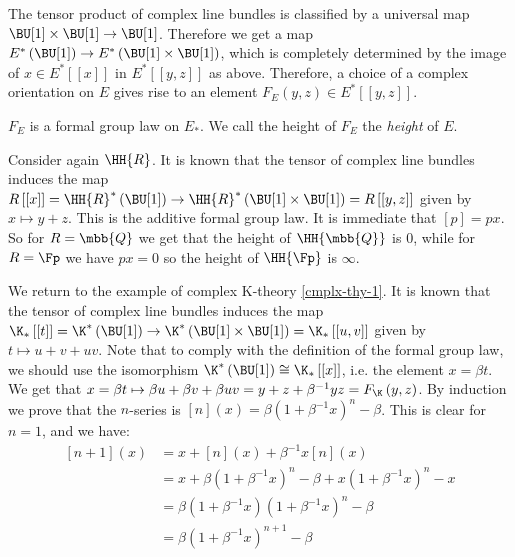 The tensor product of complex line bundles is classified by a universal map $\BU[1] \times \BU[1] \to \BU[1]$.
Therefore we get a map $E^*\left(\BU[1]\right) \to E^*\left(\BU[1] \times \BU[1]\right)$, which is completely determined by the image of $x \in E^*\left[\left[x\right]\right]$ in $E^*\left[\left[y,z\right]\right]$ as above.
Therefore, a choice of a complex orientation on $E$ gives rise to an element $F_E\left(y,z\right) \in E^*\left[\left[y,z\right]\right]$.

\begin{proposition}
	$F_E$ is a formal group law on $E_*$.
	We call the height of $F_E$ the \emph{height} of $E$.
\end{proposition}

\begin{example}
	Consider again $\HH{R}$.
	It is known that the tensor of complex line bundles induces the map
	$
	R\left[\left[x\right]\right]
	= \HH{R}^*\left(\BU[1]\right)
	\to \HH{R}^*\left(\BU[1] \times \BU[1]\right)
	= R\left[\left[y,z\right]\right]
	$
	given by $x \mapsto y + z$.
	This is the additive formal group law.
	It is immediate that $\left[p\right] = p x$.
	So for $R = \mbb{Q}$ we get that the height of $\HH{\mbb{Q}}$ is 0, while for $R = \Fp$ we have $p x = 0$ so the height of $\HH{\Fp}$ is $\infty$.
\end{example}

\begin{example}\label{cmplx-thy-2}
	We return to the example of complex K-theory \ref{cmplx-thy-1}.
	It is known that the tensor of complex line bundles induces the map
	$
	\K_*\left[\left[t\right]\right]
	= \K^*\left(\BU[1]\right)
	\to \K^*\left(\BU[1] \times \BU[1]\right)
	= \K_*\left[\left[u,v\right]\right]
	$
	given by $t \mapsto u + v + u v$.
	Note that to comply with the definition of the formal group law, we should use the isomorphism
	$\K^*\left(\BU[1]\right) \cong \K_* \left[\left[x\right]\right]$,
	i.e. the element $x = \beta t$.
	We get that $x = \beta t \mapsto \beta u + \beta v + \beta u v = y + z + \beta^{-1} y z = F_{\K}\left(y,z\right)$.
	By induction we prove that the $n$-series is $\left[n\right]\left(x\right) = \beta \left(1 + \beta^{-1} x\right)^n - \beta$.
	This is clear for $n = 1$, and we have:
	\begin{align*} 
		\left[n+1\right]\left(x\right)
		&= x + \left[n\right]\left(x\right) + \beta^{-1} x \left[n\right]\left(x\right)\\
		&= x + \beta \left(1 + \beta^{-1} x\right)^n - \beta + x \left(1 + \beta^{-1} x\right)^n - x\\
		&= \beta \left(1 + \beta^{-1} x\right) \left(1 + \beta^{-1} x\right)^n - \beta\\
		&= \beta \left(1 + \beta^{-1} x\right)^{n+1} - \beta
	\end{align*}
\end{example}

